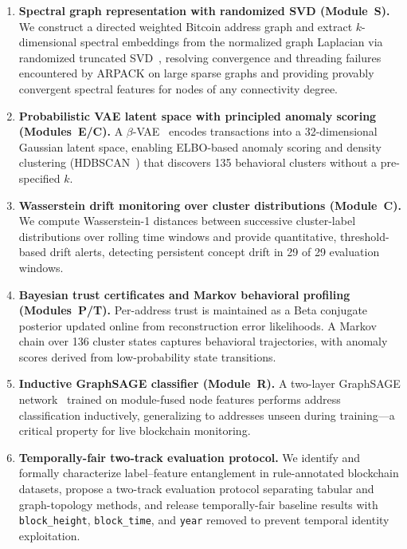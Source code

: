 \documentclass[journal]{IEEEtran}
\begin{document}
\begin{enumerate}[leftmargin=*, label=\textbf{C\arabic*}]

  \item \textbf{Spectral graph representation with randomized SVD
    (Module~S).}
    We construct a directed weighted Bitcoin address graph and extract
    $k$-dimensional spectral embeddings from the normalized graph Laplacian
    via randomized truncated SVD~\cite{Halko2011}, resolving convergence and
    threading failures encountered by ARPACK on large sparse graphs and
    providing provably convergent spectral features for nodes of any
    connectivity degree.

  \item \textbf{Probabilistic VAE latent space with principled anomaly
    scoring (Modules~E/C).}
    A $\beta$-VAE~\cite{Kingma2014} encodes transactions into a
    \num{32}-dimensional Gaussian latent space, enabling ELBO-based anomaly
    scoring and density clustering (HDBSCAN~\cite{McInnes2017}) that
    discovers \num{135} behavioral clusters without a pre-specified $k$.

  \item \textbf{Wasserstein drift monitoring over cluster distributions
    (Module~C).}
    We compute Wasserstein-1 distances between successive cluster-label
    distributions over rolling time windows and provide quantitative,
    threshold-based drift alerts, detecting persistent concept drift in
    \num{29} of \num{29} evaluation windows.

  \item \textbf{Bayesian trust certificates and Markov behavioral profiling
    (Modules~P/T).}
    Per-address trust is maintained as a Beta conjugate posterior updated
    online from reconstruction error likelihoods.
    A Markov chain over \num{136} cluster states captures behavioral
    trajectories, with anomaly scores derived from low-probability
    state transitions.

  \item \textbf{Inductive GraphSAGE classifier (Module~R).}
    A two-layer GraphSAGE network~\cite{Hamilton2017} trained on
    module-fused node features performs address classification inductively,
    generalizing to addresses unseen during training---a critical property
    for live blockchain monitoring.

  \item \textbf{Temporally-fair two-track evaluation protocol.}
    We identify and formally characterize label--feature entanglement in
    rule-annotated blockchain datasets, propose a two-track evaluation
    protocol separating tabular and graph-topology methods, and release
    temporally-fair baseline results with \texttt{block\_height},
    \texttt{block\_time}, and \texttt{year} removed to prevent temporal
    identity exploitation.


\end{enumerate}
\end{document}
